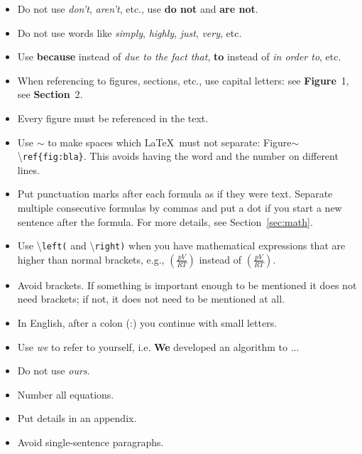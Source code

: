 \begin{itemize}
	\item Do not use \emph{don't}, \emph{aren't}, etc., use \textbf{do not} and \textbf{are not}.
	\item Do not use words like \emph{simply}, \emph{highly}, \emph{just}, \emph{very}, etc.
	\item Use \textbf{because} instead of \emph{due to the fact that}, \textbf{to} instead of \emph{in order to}, etc.
	\item When referencing to figures, sections, etc., use capital letters: see \textbf{Figure}~1, see \textbf{Section}~2.
	\item Every figure must be referenced in the text.
	\item Use $\sim$ to make spaces which \LaTeX\ must not separate: Figure$\sim$\textbackslash\texttt{ref\{fig:bla\}}.
	This avoids having the word and the number on different lines.
	\item Put punctuation marks after each formula as if they were text. 
	Separate multiple consecutive formulas by commas and put a dot if you start a new sentence after the formula.
	For more details, see Section~\ref{sec:math}.
	\item Use \textbackslash\texttt{left(} and \textbackslash\texttt{right)} when you have mathematical expressions that are higher than normal brackets, e.g., $\left(\frac{pV}{RT}\right)$ instead of $(\frac{pV}{RT})$.
	\item Avoid brackets. If something is important enough to be mentioned it does not need brackets; if not, it does not need to be mentioned at all.
	\item In English, after a colon (:) you continue with small letters.
	\item Use \emph{we} to refer to yourself, i.e. \textbf{We} developed an algorithm to ...
	\item Do not use \emph{ours}.
	\item Number all equations.
	\item Put details in an appendix.
	\item Avoid single-sentence paragraphs.
\end{itemize}